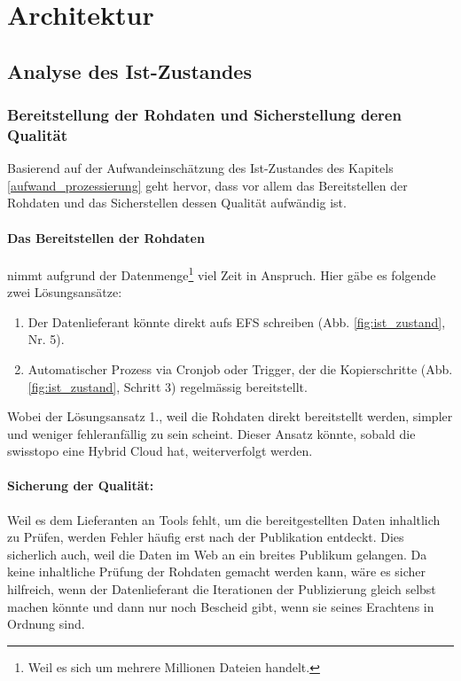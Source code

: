 \section{Architektur}

\subsection{Analyse des Ist-Zustandes}
\subsubsection{Bereitstellung der Rohdaten und Sicherstellung deren Qualität}\label{kap:sicherstellung_qualitaet}
Basierend auf der Aufwandeinschätzung des Ist-Zustandes des Kapitels \ref{aufwand_prozessierung} geht hervor, dass vor allem das Bereitstellen der Rohdaten und das Sicherstellen dessen Qualität aufwändig ist. 

\paragraph{Das Bereitstellen der Rohdaten} nimmt aufgrund der Datenmenge\footnote{Weil es sich um mehrere Millionen Dateien handelt.} viel Zeit in Anspruch. Hier gäbe es folgende zwei Lösungsansätze:
\begin{enumerate}
\item Der Datenlieferant könnte direkt aufs EFS schreiben (Abb. \ref{fig:ist_zustand}, Nr. 5).
\item Automatischer Prozess via Cronjob oder Trigger, der die Kopierschritte (Abb. \ref{fig:ist_zustand}, Schritt 3) regelmässig bereitstellt.
\end{enumerate}

Wobei der Lösungsansatz 1., weil die Rohdaten direkt bereitstellt werden, simpler und weniger fehleranfällig zu sein scheint. Dieser Ansatz könnte, sobald die swisstopo eine Hybrid Cloud hat, weiterverfolgt werden.

\paragraph{Sicherung der Qualität:} Weil es dem Lieferanten an Tools fehlt, um die bereitgestellten Daten inhaltlich zu Prüfen, werden Fehler 
häufig erst nach der Publikation entdeckt. Dies sicherlich auch, weil die Daten im Web an ein breites Publikum gelangen. Da keine inhaltliche Prüfung der Rohdaten gemacht werden kann, wäre es sicher hilfreich, wenn der Datenlieferant die Iterationen der Publizierung gleich selbst machen könnte und dann nur noch Bescheid gibt, wenn sie seines Erachtens in Ordnung sind.

